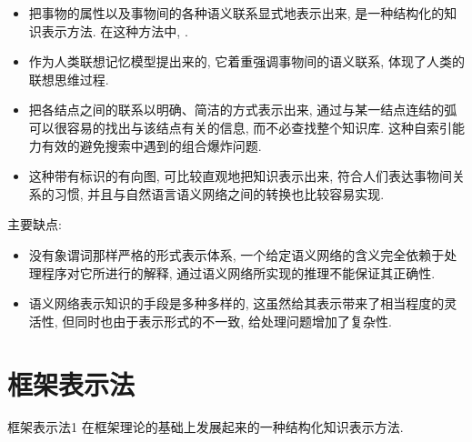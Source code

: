 \begin{itemize}
    \item {} 把事物的属性以及事物间的各种语义联系显式地表示出来, 是一种结构化的知识表示方法. 在这种方法中, .
    \item {} 作为人类联想记忆模型提出来的, 它着重强调事物间的语义联系, 体现了人类的联想思维过程.
    \item {} 把各结点之间的联系以明确、简洁的方式表示出来, 通过与某一结点连结的弧可以很容易的找出与该结点有关的信息, 而不必查找整个知识库. 这种自索引能力有效的避免搜索中遇到的组合爆炸问题.
    \item {} 这种带有标识的有向图, 可比较直观地把知识表示出来, 符合人们表达事物间关系的习惯, 并且与自然语言语义网络之间的转换也比较容易实现.
\end{itemize}
主要缺点:
\begin{itemize}
    \item {} 没有象谓词那样严格的形式表示体系, 一个给定语义网络的含义完全依赖于处理程序对它所进行的解释, 通过语义网络所实现的推理不能保证其正确性.
    \item {} 语义网络表示知识的手段是多种多样的, 这虽然给其表示带来了相当程度的灵活性, 但同时也由于表示形式的不一致, 给处理问题增加了复杂性.
\end{itemize}
\section{框架表示法}
\begin{mydef}{框架表示法}{1}
    在框架理论的基础上发展起来的一种结构化知识表示方法.
\end{mydef}
%
%
%
%
